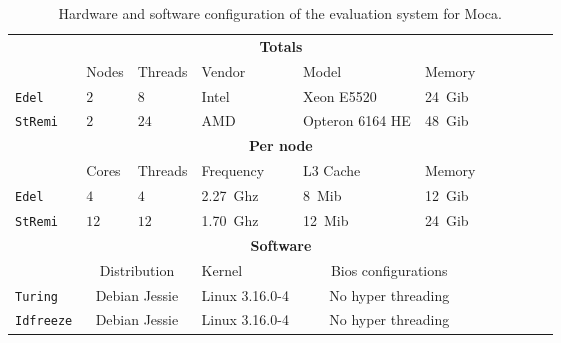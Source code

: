 \begin{table}[htb]
    \centering
    \begin{tabular}{lllllllllll}
        \toprule
        & \multicolumn{5}{c}{\textbf{Totals}}\\
        \cmidrule(lr){2-6}
        & Nodes & Threads & Vendor & Model & Memory \\
        \cmidrule(lr){2-6}
        \texttt{Edel}    & $2$ & $8$  & Intel & Xeon E5520      & \SI{24}{Gib} \\
        \texttt{StRemi} & $2$ & $24$ & AMD   & Opteron 6164 HE & \SI{48}{Gib} \\
        \midrule
        & \multicolumn{5}{c}{\textbf{Per node}}\\
        \cmidrule(lr){2-6}
        & Cores & Threads & Frequency & L3 Cache & Memory \\
        \cmidrule(lr){2-6}
        \texttt{Edel}   & $4$  & $4$   & \SI{2.27}{Ghz}& \SI{8}{Mib}  & \SI{12}{Gib} \\
        \texttt{StRemi} & $12$ & $12$  & \SI{1.70}{Ghz}& \SI{12}{Mib} & \SI{24}{Gib}\\
        \midrule
        & \multicolumn{5}{c}{\textbf{Software}}\\
        \cmidrule(lr){2-6}
        & \multicolumn{2}{c}{Distribution} & Kernel &
            \multicolumn{2}{c}{Bios configurations} \\
        \cmidrule(lr){2-6}
        \texttt{Turing}   & \multicolumn{2}{c}{Debian Jessie} & Linux 3.16.0-4 &
            \multicolumn{2}{c}{No hyper threading} \\
        \texttt{Idfreeze} & \multicolumn{2}{c}{Debian Jessie} & Linux 3.16.0-4 &
            \multicolumn{2}{c}{No hyper threading}\\
        \bottomrule
    \end{tabular}
    \caption{Hardware and software configuration of the evaluation system for Moca.}
    \label{tab:hw-moca}
\end{table}

